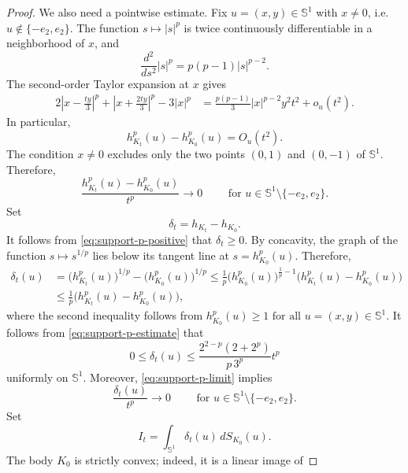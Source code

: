 \documentclass[11pt,a4paper]{amsart}
\theoremstyle{plain}
\theoremstyle{definition}
\begin{document}
\begin{proof}
We also need a pointwise estimate. Fix
\(u=(x,y)\in\mathbb S^1\) with \(x\neq0\), i.e. $u\not\in \{-e_2, e_2\}$. The function
\(s\mapsto |s|^p\) is twice continuously differentiable in a
neighborhood of \(x\), and
\[
    \frac{d^2}{ds^2}|s|^p
    =
    p(p-1)|s|^{p-2}.
\]
The second-order Taylor expansion at \(x\) gives
\[
\begin{aligned}
    2\left|x-\frac{ty}{3}\right|^p
    +
    \left|x+\frac{2ty}{3}\right|^p
    -
    3|x|^p
    &=
    \frac{p(p-1)}{3}|x|^{p-2}y^2t^2
    +o_u(t^2).
\end{aligned}
\]
In particular,
\[
    h_{K_t}^p(u)-h_{K_0}^p(u)=O_u(t^2).
\]
The condition \(x\neq0\) excludes only the two points
\((0,1)\) and \((0,-1)\) of \(\mathbb S^1\). Therefore,
\begin{equation}
    \label{eq:support-p-limit}
    \frac{h_{K_t}^p(u)-h_{K_0}^p(u)}{t^p}
    \longrightarrow0
    \qquad\text{ for }u\in\mathbb S^1 \setminus \{-e_2, e_2\}.
\end{equation}
Set
\[
    \delta_t=h_{K_t}-h_{K_0}.
\]
It follows from \eqref{eq:support-p-positive} that \(\delta_t\geq0\).  By concavity, the graph of the function $s \mapsto s^{1 / p}$ lies below its tangent line at $s=h_{K_0}^p(u)$. Therefore,
\[
\begin{aligned}
    \delta_t(u)
    &=
    \bigl(h_{K_t}^p(u)\bigr)^{1/p}
    -
    \bigl(h_{K_0}^p(u)\bigr)^{1/p}
    \leq
    \frac{1}{p}
    \bigl(h_{K_0}^p(u)\bigr)^{\frac1p-1}
    \bigl(h_{K_t}^p(u)-h_{K_0}^p(u)\bigr)
    \\
    &\leq
    \frac{1}{p}
    \bigl(h_{K_t}^p(u)-h_{K_0}^p(u)\bigr),
\end{aligned}
\]
where the second inequality follows from 
$
    h_{K_0}^p(u)\geq
    1 \mbox{ for all } u=(x,y)\in\mathbb S^1.
$
It follows from \eqref{eq:support-p-estimate} that
\begin{equation}
    \label{eq:delta-estimate}
    0
    \leq
    \delta_t(u)
    \leq
    \frac{2^{2-p}(2+2^p)}{p\,3^p}t^p
\end{equation}
uniformly on \(\mathbb S^1\). Moreover,
\eqref{eq:support-p-limit} implies
\begin{equation}
    \label{eq:delta-limit}
    \frac{\delta_t(u)}{t^p}
    \longrightarrow0
    \qquad\text{ for  }u\in\mathbb S^1 \setminus \{-e_2, e_2\}.
\end{equation}
Set
\[
    I_t
    =
    \int_{\mathbb S^1}\delta_t(u)\,dS_{K_0}(u).
\]
The body \(K_0\) is strictly convex; indeed, it is a linear image of

\end{proof}
\end{document}
